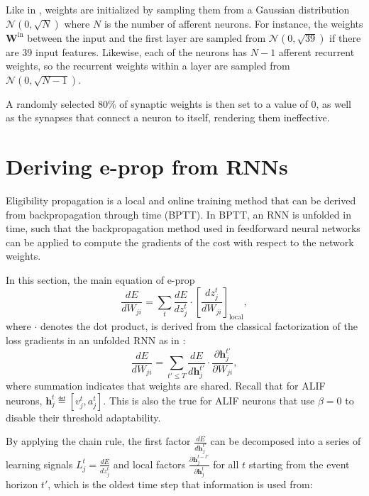         Like in \citet{bellec2020solution}, weights are initialized by sampling them from a Gaussian distribution $\mathcal{N}\left(0, \sqrt{N}\right)$ where $N$ is the number of afferent neurons.
        For instance, the weights $\mathbf{W}^\text{in}$ between the input and the first layer are sampled from $\mathcal{N}\left(0, \sqrt{39}\right)$ if there are 39 input features.
        Likewise, each of the neurons has $N-1$ afferent recurrent weights, so the recurrent weights within a layer are sampled from $\mathcal{N}\left(0, \sqrt{N-1}\right)$.

        A randomly selected 80\% of synaptic weights is then set to a value of 0, as well as the synapses that connect a neuron to itself, rendering them ineffective.


    \section{Deriving e-prop from RNNs}\label{sec:derivefromBPTT}
        Eligibility propagation is a local and online training method that can be derived from backpropagation through time (BPTT).
        In BPTT, an RNN is unfolded in time, such that the backpropagation method used in feedforward neural networks can be applied to compute the gradients of the cost with respect to the network weights.

        In this section, the main equation of e-prop
        \begin{equation}
        \frac{dE}{dW_{ji}} =
        \sum_t\frac{dE}{dz_j^t}\cdot\left[\frac{dz_j^t}{dW_{ji}}\right]_\text{local},
        \end{equation}
        where $\cdot$ denotes the dot product, is derived from the classical factorization of the loss gradients in an unfolded RNN as in \citet{bellec2020solution}:
        \begin{equation}\label{eq:clafac}
        \frac{dE}{dW_{ji}} = \sum_{t' \leq T}\frac{dE}{d\mathbf{h}_j^{t'}}\cdot\frac{\partial \mathbf{h}_j^{t'}}{\partial W_{ji}},
        \end{equation}
        where summation indicates that weights are shared.
        Recall that for ALIF neurons, $\mathbf{h}^t_j \eqdef \left[v^t_j, a^t_j\right]$.
        This is also the true for ALIF neurons that use $\beta=0$ to disable their threshold adaptability.

        By applying the chain rule, the first factor $\frac{dE}{d\mathbf{h}_j^{t'}}$ can be decomposed into a series of learning signals $L_j^t = \frac{dE}{dz_j^t}$ and local factors $\frac{\partial\mathbf{h}_j^{t-t'}}{\partial\mathbf{h}_j^t}$ for all $t$ starting from the event horizon $t'$, which is the oldest time step that information is used from:

